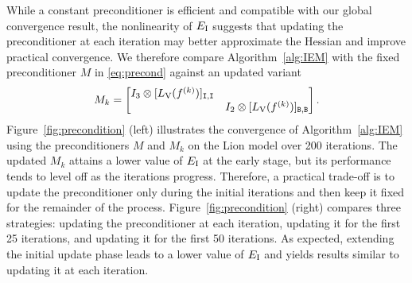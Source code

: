 \documentclass[11pt,a4paper]{article}
\def\rV{\mathrm{V}}
\begin{document}
While a constant preconditioner is efficient and compatible with our global convergence result, the nonlinearity of $E_{\mathrm{I}}$ suggests that updating the preconditioner at each iteration may better approximate the Hessian and improve practical convergence.
We therefore compare Algorithm~\ref{alg:IEM} with the fixed preconditioner $M$ in \eqref{eq:precond} against an updated variant
\begin{equation}
M_k = 
\begin{bmatrix}
I_3 \otimes [L_\rV(f^{(k)})]_{\I,\I} \\
& I_2 \otimes [L_\rV(f^{(k)})]_{\B,\B}
\end{bmatrix}.
\label{eq:precond_vary}
\end{equation}
Figure~\ref{fig:precondition} (left) illustrates the convergence of Algorithm~\ref{alg:IEM} using the preconditioners $M$ and $M_k$ on the Lion model over 200 iterations. The updated $M_k$ attains a lower value of $E_{\mathrm{I}}$ at the early stage, but its performance tends to level off as the iterations progress. Therefore, a practical trade-off is to update the preconditioner only during the initial iterations and then keep it fixed for the remainder of the process. Figure~\ref{fig:precondition} (right) compares three strategies: updating the preconditioner at each iteration, updating it for the first 25 iterations, and updating it for the first 50 iterations. As expected, extending the initial update phase leads to a lower value of $E_{\mathrm{I}}$ and yields results similar to updating it at each iteration.

 
\end{document}
